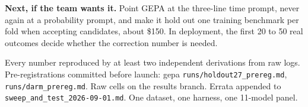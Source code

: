 \documentclass[10pt]{article}
\begin{document}
\textbf{Next, if the team wants it.} Point GEPA at the three-line time prompt, never again at a probability prompt, and make it hold out one training benchmark per fold when accepting candidates, about \$150. In deployment, the first 20 to 50 real outcomes decide whether the correction number is needed.

\vspace{2pt}
{\footnotesize\color{mut}Every number reproduced by at least two independent derivations from raw logs. Pre-registrations committed before launch: gepa \texttt{runs/holdout27\_prereg.md}, \texttt{runs/darm\_prereg.md}. Raw cells on the results branch. Errata appended to \texttt{sweep\_and\_test\_2026-09-01.md}. One dataset, one harness, one 11-model panel.}
\end{document}
